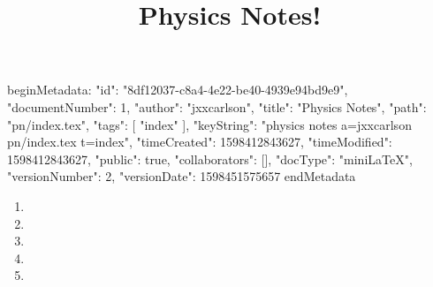 beginMetadata:
{
    "id": "8df12037-c8a4-4e22-be40-4939e94bd9e9",
    "documentNumber": 1,
    "author": "jxxcarlson",
    "title": "Physics Notes",
    "path": "pn/index.tex",
    "tags": [
        "index"
    ],
    "keyString": "physics notes a=jxxcarlson pn/index.tex t=index",
    "timeCreated": 1598412843627,
    "timeModified": 1598412843627,
    "public": true,
    "collaborators": [],
    "docType": "miniLaTeX",
    "versionNumber": 2,
    "versionDate": 1598451575657
}
endMetadata
\title{Physics Notes!}

\maketitle

\begin{enumerate}

\item {}

\item {}

\item {}

\item {}

\item {}


\end{enumerate}
